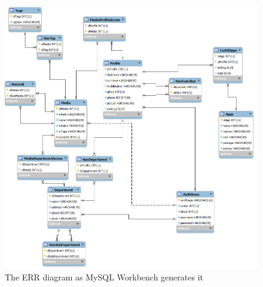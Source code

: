 \begin{figure}[H]
	\centering
		\includegraphics[width=1.00\textwidth]{images/workbenchWrong.png}
	\caption{The ERR diagram as MySQL Workbench generates it}
	\label{fig:workbenchWrong}
\end{figure}
